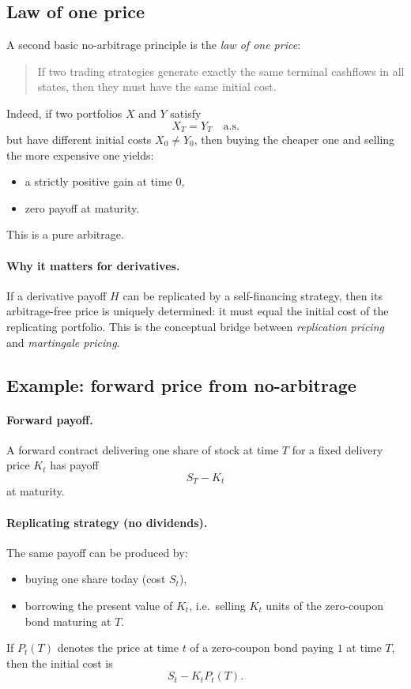 \documentclass[11pt]{article}
\newcommand{\1}{\mathbf{1}}
\begin{document}
\subsection{Law of one price}

A second basic no-arbitrage principle is the \emph{law of one price}:

\begin{quote}
If two trading strategies generate exactly the same terminal cashflows in all states,
then they must have the same initial cost.
\end{quote}

Indeed, if two portfolios \(X\) and \(Y\) satisfy
$$
X_T=Y_T \quad \text{a.s.}
$$
but have different initial costs \(X_0\neq Y_0\), then buying the cheaper one and selling the more expensive one yields:
\begin{itemize}[leftmargin=1.4em]
    \item a strictly positive gain at time \(0\),
    \item zero payoff at maturity.
\end{itemize}
This is a pure arbitrage.

\paragraph{Why it matters for derivatives.}
If a derivative payoff \(H\) can be replicated by a self-financing strategy,
then its arbitrage-free price is uniquely determined:
it must equal the initial cost of the replicating portfolio.
This is the conceptual bridge between \emph{replication pricing} and \emph{martingale pricing}.

\subsection{Example: forward price from no-arbitrage}

\paragraph{Forward payoff.}
A forward contract delivering one share of stock at time \(T\) for a fixed delivery price \(K_t\)
has payoff
$$
S_T-K_t
$$
at maturity.

\paragraph{Replicating strategy (no dividends).}
The same payoff can be produced by:
\begin{itemize}[leftmargin=1.4em]
    \item buying one share today (cost \(S_t\)),
    \item borrowing the present value of \(K_t\), i.e.\ selling \(K_t\) units of the zero-coupon bond maturing at \(T\).
\end{itemize}
If \(P_t(T)\) denotes the price at time \(t\) of a zero-coupon bond paying \(1\) at time \(T\), then the initial cost is
$$
S_t-K_t P_t(T).
$$
\end{document}
